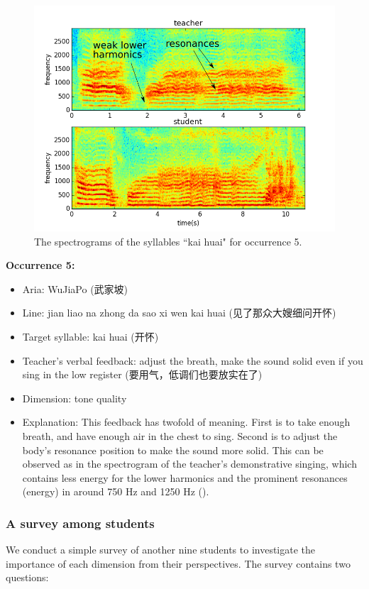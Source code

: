 \begin{figure}[ht!]
\includegraphics[width=\textwidth]{figs/spectro_vis/ch3_occ5.png}
\caption{The spectrograms of the syllables ``kai huai" for occurrence 5.}
\label{fig:occurrence_5}
\end{figure}

\noindent\textbf{Occurrence 5:}

\begin{itemize}[leftmargin=*, noitemsep]
\item Aria: WuJiaPo (武家坡)
\item Line: jian liao na zhong da sao xi wen kai huai (见了那众大嫂细问开怀)
\item Target syllable: kai huai (开怀)
\item Teacher's verbal feedback: adjust the breath, make the sound solid even if you sing in the low register (要用气，低调们也要放实在了)
\item Dimension: tone quality
\item Explanation: This feedback has twofold of meaning. First is to take enough breath, and have enough air in the chest to sing. Second is to adjust the body's resonance position to make the sound more solid. This can be observed as in the spectrogram of the teacher's demonstrative singing, which contains less energy for the lower harmonics and the prominent resonances (energy) in around 750 Hz and 1250 Hz ().
\end{itemize}

\subsubsection{A survey among students}
We conduct a simple survey of another nine students to investigate the importance of each dimension from their perspectives. The survey contains two questions: 

